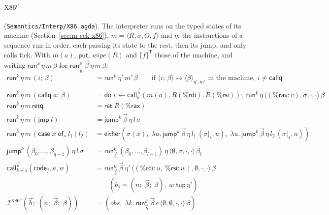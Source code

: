 \documentclass[10pt]{article}
\theoremstyle{acmplain}
\newcommand{\key}[1]{\mathsf{#1}}
\newcommand{\obs}{\mathit{obs}}
\newcommand{\codeV}[1]{\key{code}_{#1}}
\newcommand{\Ret}{\key{ret}\;}
\newcommand{\Do}{\key{do}\;}
\newcommand{\CALL}[2]{\key{call}^{#1}_{#2}}
\newcommand{\Interp}[1]{\mathcal{I}^{#1}}
\newcommand{\rax}{\%\key{rax}}
\newcommand{\rdi}{\%\key{rdi}}
\newcommand{\rsi}{\%\key{rsi}}
\newcommand{\Tcut}[2]{#1|_{#2}}                %
\newcommand{\Tres}[1]{\lceil #1 \rceil^{\mathsf{T}}}      %
\newcommand{\Twipe}[1]{\mathit{wipe}(#1)}
\newcommand{\Ml}[1]{\textrm{#1}^{\mu}}                  %
\newcommand{\Mtup}[1]{\key{tup}\,#1}                      %
\newcommand{\Mxcase}[4]{\key{case}\;#1\;\key{of}_{#2}\;#3 \mid #4}  %
\begin{document}
\paragraph{$\Ml{X86}$} (\texttt{Semantics/Interp/X86.agda}). The interpreter
runs on the typed states of its machine (Section~\ref{sec:m-cek-x86}),
$m = \langle R, \sigma, O, f \rangle$ and $\eta$; the instructions of a
sequence run in order, each passing its state to the rest, then its jump,
and only calls tick. With $m(a)$, $\key{put}$, $\Twipe{R}$ and $\Tres{f}$
those of the machine, and writing $\key{run}^k\,\eta\,m\,\beta$ for
$\key{run}^k_{\vec{b}}\,\vec{\beta}\,\eta\,m\,\beta$:
\begin{align*}
  \key{run}^k\,\eta\,m\,(i;\, \beta) &= \key{run}^k\,\eta'\,m'\,\beta
    \qquad \text{if } \langle i;\, \beta\rangle \mapsto \langle \beta \rangle_{\eta', m'} \text{ in the machine},\ i \neq \key{callq} \\
  \key{run}^k\,\eta\,m\,(\key{callq}\; a;\, \beta) &=
    \Do v \leftarrow \CALL{\vec{b}}{k}(m(a), R(\rdi), R(\rsi));\;
    \key{run}^k\,\eta\,\langle (\rax{:}v), \sigma, \cdot, \cdot \rangle\,\beta \\
  \key{run}^k\,\eta\,m\,\key{retq} &= \Ret R(\rax) \\
  \key{run}^k\,\eta\,m\,(\key{jmp}\; l) &= \key{jump}^k\,\vec{\beta}\,\eta\,l\,\sigma \\
  \key{run}^k\,\eta\,m\,(\Mxcase{x}{s}{l_1}{l_2}) &=
    \key{either}(\sigma(x),\; \lambda u.\, \key{jump}^k\,\vec{\beta}\,\eta\,l_1\,(\Tcut{\sigma}{s}, u),\;
      \lambda u.\, \key{jump}^k\,\vec{\beta}\,\eta\,l_2\,(\Tcut{\sigma}{s}, u)) \\
  \key{jump}^k\,(\beta_0, \ldots, \beta_{q-1})\,\eta\,l\,\sigma &=
    \key{run}^k_{\vec{b}}\,(\beta_0, \ldots, \beta_{l-1})\,\eta\,\langle \emptyset, \sigma, \cdot, \cdot \rangle\,\beta_l \\
  \CALL{\vec{b}}{k+1}(\codeV{j}, u, w) &= \key{run}^k_{\vec{b}}\,\vec{\beta}\,\eta'\,\langle (\rdi{:}u,\ \rsi{:}w), \emptyset, \cdot, \cdot \rangle\,\beta \\
    &\qquad (b_j = (n;\; \vec{\beta};\; \beta),\ u : \Mtup{\eta'}) \\
  \Interp{\Ml{X86}}(\vec{b};\; (n;\; \vec{\beta};\; \beta)) &=
    (\obs,\; \lambda k.\, \key{run}^k_{\vec{b}}\,\vec{\beta}\,\epsilon\,\langle \emptyset, \emptyset, \cdot, \cdot \rangle\,\beta)
\end{align*}

\end{document}
